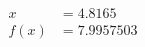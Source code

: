 \documentclass[preview]{standalone}
\begin{document}
\begin{align*}
x &= 4.8165\\f(x) &= 7.9957503
\end{align*}
\end{document}
